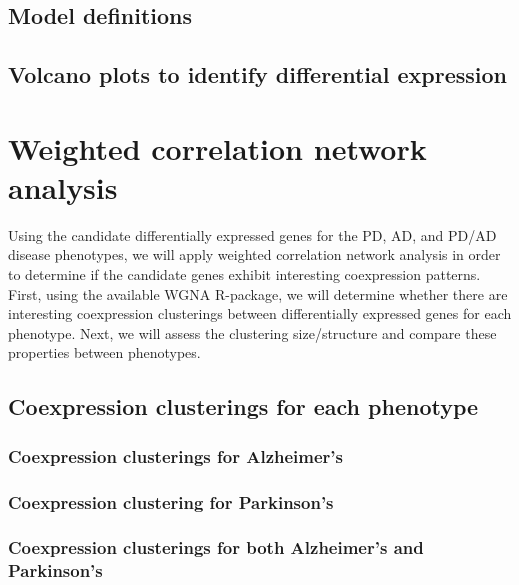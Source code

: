 \subsection{Model definitions}
\label{subsec:model-definitions}

\subsection{Volcano plots to identify differential expression}
\label{subsec:volc-plots-ident}


\section{Weighted correlation network analysis}
\label{sec:weight-corr-netw}

 Using the candidate differentially expressed genes for the PD, AD, and PD/AD disease phenotypes, we will apply weighted correlation network analysis in order to determine if the candidate genes exhibit interesting coexpression patterns. First, using the available WGNA R-package\cite{Langfelder2008}, we will determine whether there are interesting coexpression clusterings between differentially expressed genes for each phenotype. Next, we will assess the clustering size/structure and compare these properties between phenotypes.


\subsection{Coexpression clusterings for each phenotype}
\label{subsec:coexpr-clust-each}

\subsubsection{Coexpression clusterings for Alzheimer's}
\label{subsubsec:coexpr-clust-alzh}

\subsubsection{Coexpression clustering for Parkinson's}
\label{subsubsec:coexpr-clust-park}

\subsubsection{Coexpression clusterings for both Alzheimer's and Parkinson's}
\label{subsubsec:coexpr-clust-both}


